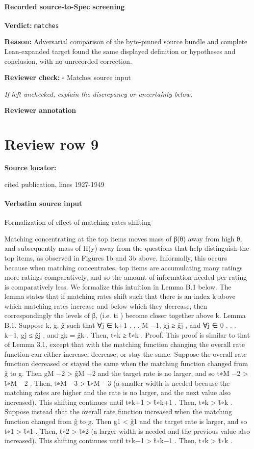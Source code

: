 \documentclass[10pt]{article}
\newcommand{\reviewerbox}{%
  \par\noindent\fbox{\parbox{0.96\linewidth}{\rule{0pt}{0.38in}}}\par
}
\newcommand{\reviewmatch}[1]{%
  \par\noindent\textbf{Reviewer check:} $\square$\; #1\par
  \noindent\emph{If left unchecked, explain the discrepancy or uncertainty below.}\par
}
\begin{document}
\paragraph{Recorded source-to-Spec screening}
\textbf{Verdict:} \texttt{matches}
\\
{\raggedright
\textbf{Reason:} Adversarial comparison of the byte-\allowbreak{}pinned source bundle and complete Lean-\allowbreak{}expanded target found the same displayed definition or hypotheses and conclusion, with no unrecorded correction.\allowbreak{}
\par}
\reviewmatch{Matches source input}
\noindent\textbf{Reviewer annotation}\par
\reviewerbox
\clearpage
\hypertarget{source-claim-52ebae870dd67c82}{}
\section*{Review row 9}
\textbf{Source locator:} {\footnotesize\raggedright cited publication, lines 1927-\allowbreak{}1949\par}
\paragraph{Verbatim source input}
\begin{ReviewVerbatim}
Formalization of effect of matching rates shifting

Matching concentrating at the top items moves mass of β(θ) away from high θ, and subsequently
mass of H(y) away from the questions that help distinguish the top items, as observed in Figures 1b and 3b above. Informally, this occurs because when matching concentrates, top items are
accumulating many ratings more ratings comparatively, and so the amount of information needed
per rating is comparatively less. We formalize this intuition in Lemma B.1 below.
The lemma states that if matching rates shift such that there is an index k above which matching
rates increase and below which they decrease, then correspondingly the levels of β, (i.e. ti ) become
closer together above k.
Lemma B.1. Suppose k, g, g̃ such that ∀j ∈ {k+1 . . . M −1}, gj ≥ g̃j , and ∀j ∈ {0 . . . k−1}, gj ≤ g̃j ,
and gk = g̃k . Then, t∗k ≥ t̃∗k .
Proof. This proof is similar to that of Lemma 3.1, except that with the matching function changing
the overall rate function can either increase, decrease, or stay the same. Suppose the overall rate
function decreased or stayed the same when the matching function changed from g̃ to g. Then
gM −2 > g̃M −2 and the target rate is no larger, and so t∗M −2 > t̃∗M −2 . Then, t∗M −3 > t̃∗M −3 (a smaller
width is needed because the matching rates are higher and the rate is no larger, and the next value
also increased). This shifting continues until t∗k+1 > t̃∗k+1 . Then, t∗k > t̃∗k .
Suppose instead that the overall rate function increased when the matching function changed
from g̃ to g. Then g1 < g̃1 and the target rate is larger, and so t∗1 > t̃∗1 . Then, t∗2 > t̃∗2 (a larger
width is needed and the previous value also increased). This shifting continues until t∗k−1 > t̃∗k−1 .
Then, t∗k > t̃∗k .
\end{ReviewVerbatim}
\end{document}
